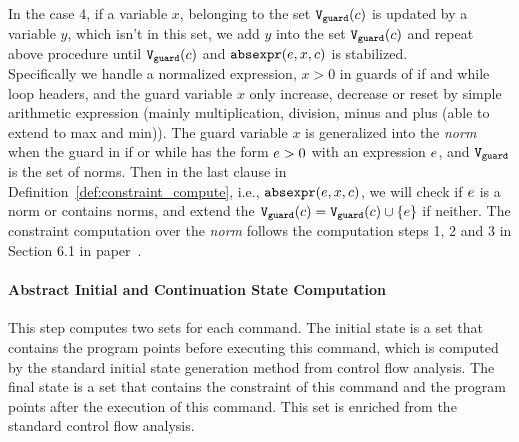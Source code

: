 %
In the case 4, if a variable $x$, belonging to the set 
  $\mathtt{V}_{\mathtt{guard}}(c)$ is updated by a variable $y$, which isn't in this set, 
  we add $y$ into the set $\mathtt{V}_{\mathtt{guard}}(c)$ and repeat 
  above procedure  until $\mathtt{V}_{\mathtt{guard}}(c)$ and $\mathtt{abs}{\mathtt{expr}}(e, x, c)$ is stabilized. 
  \\
Specifically 
we handle a 
normalized expression, $x > 0$
in guards of if and while loop headers, and 
the guard variable $x$ only increase, decrease or reset by 
simple arithmetic expression (mainly multiplication, division, minus and plus (able to extend to max and min)). 
The guard variable $x$ is generalized into the \emph{norm} when the guard 
in if or while has the form $e > 0$ with an expression $e$, and $\mathtt{V}_{\mathtt{guard}}$ is the set of norms.
Then in the last clause in Definition~\ref{def:constraint_compute}, i.e., $\mathtt{abs}{\mathtt{expr}}(e, x, c)$,
we will check if $e$ is a norm or contains norms, and extend the $\mathtt{V}_{\mathtt{guard}}(c)= \mathtt{V}_{\mathtt{guard}}(c)\cup \{e\}$ if neither.
The constraint computation over the \emph{norm} follows the computation steps 1, 2 and 3 in Section 6.1 in paper~\cite{SinnZV17}. 
%
\paragraph{Abstract Initial and Continuation State Computation}
This step computes two sets for each command. 
The initial state is a set that contains the
program points before executing this command, which is computed by the standard initial state generation method from control flow analysis.
The final state is a set
that contains the constraint of this command and the program points after the execution of this command.
This set is enriched 
from the standard control flow analysis.

